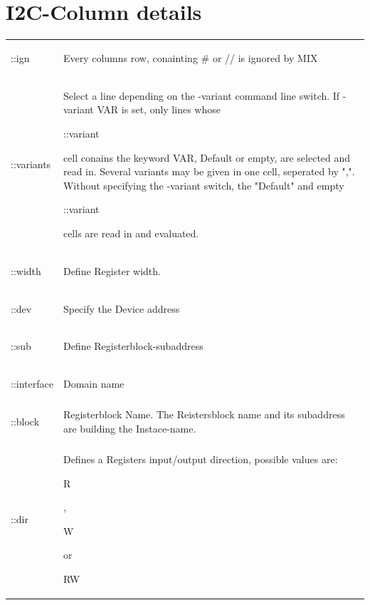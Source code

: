 \documentclass[a4paper,12pt]{report}
\begin{document}
\section{I2C-Column details}
\begin{tabular}{lp{14cm}}
  \begin{bf}::ign\end{bf} & Every columns row, conainting \# or // is ignored by MIX\\
  \begin{bf}::variants\end{bf} & Select a line depending on the -variant command line switch. If -variant VAR is set, only lines whose \begin{tt}::variant\end{tt} cell conains the keyword VAR, Default or empty, are selected and  read in. Several variants may be given in one cell, seperated by ",". Without specifying the -variant switch, the "Default" and empty \begin{tt}::variant\end{tt} cells are read in and evaluated.\\
  \begin{bf}::width\end{bf} & Define Register width.\\
  \begin{bf}::dev\end{bf} & Specify the Device address\\
  \begin{bf}::sub\end{bf} & Define Registerblock-subaddress\\
  \begin{bf}::interface\end{bf} & Domain name\\
  \begin{bf}::block\end{bf} & Registerblock Name. The Reistersblock name and its subaddress are building the Instace-name.\\
  \begin{bf}::dir\end{bf} & Defines a Registers input/output direction, possible values are: \begin{tt}R\end{tt}, \begin{tt}W\end{tt} or \begin{tt}RW\end{tt}\\

\end{tabular}
\end{document}
